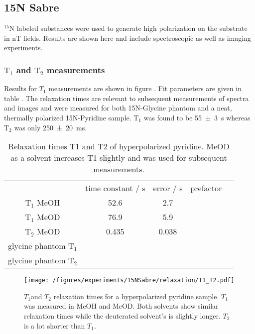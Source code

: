     \subsection{15N Sabre}
        $^{15}\mathrm{N}$ labeled substances were used to generate high polarization on the substrate in \si{\nano\tesla} fields. Results are shown here and include spectroscopic as well as imaging experiments.
    \subsubsection{$\mathrm{T_1}$ and $\mathrm{T_2}$ measurements}
        Results for $T_1$ measurements are shown in figure . Fit parameters are given in table .
        The relaxation times are relevant to subsequent measurements of spectra and images and were measured for both 15N-Glycine phantom and a neat, thermally polarized 15N-Pyridine sample. $\mathrm{T}_1$ was found to be \SI{55\pm 3}{\second} whereas $\mathrm{T}_2$ was only \SI{250\pm 20}{\milli\second}.
        \begin{table}
            \begin{tabular}{ccccc}
                    & time constant / s & error / s & prefactor \\
                $\mathrm{T_1}$ MeOH & 52.6 & 2.7\\
                $\mathrm{T_1}$ MeOD & 76.9 & 5.9\\
                $\mathrm{T_2}$ MeOD &  0.435 & 0.038\\
                glycine phantom $\mathrm{T_1}$& \\
                glycine phantom $\mathrm{T_2}$& \\
            \end{tabular}
        \caption[Relaxation times]{Relaxation times T1 and T2 of hyperpolarized pyridine. MeOD as a solvent increases T1 slightly and was used for subsequent measurements.}
        \end{table}
        \begin{figure}
            \texttt{[image: /figures/experiments/15NSabre/relaxation/T1\_T2.pdf]}
            \caption{$T_1$and $T_2$ relaxation times for a hyperpolarized pyridine sample. $T_1$ was measured in MeOH and MeOD. Both solvents show similar relaxation times while the deuterated solvent's is slightly longer. $T_2$ is a lot shorter than $T_1$.}
        \end{figure}
